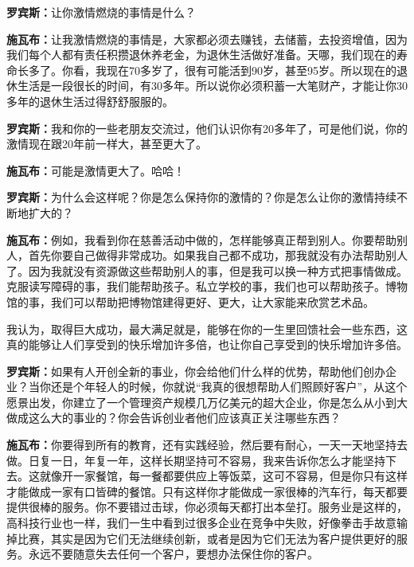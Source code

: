\begin{BookQuote}
\textbf{罗宾斯：}让你激情燃烧的事情是什么？
\end{BookQuote}

\begin{BookQuote}
\textbf{施瓦布：}让我激情燃烧的事情是，大家都必须去赚钱，去储蓄，去投资增值，因为我们每个人都有责任积攒退休养老金，为退休生活做好准备。天哪，我们现在的寿命长多了。你看，我现在70多岁了，很有可能活到90岁，甚至95岁。所以现在的退休生活是一段很长的时间，有30多年。所以说你必须积蓄一大笔财产，才能让你30多年的退休生活过得舒舒服服的。
\end{BookQuote}

\begin{BookQuote}
\textbf{罗宾斯：}我和你的一些老朋友交流过，他们认识你有20多年了，可是他们说，你的激情现在跟20年前一样大，甚至更大了。
\end{BookQuote}

\begin{BookQuote}
\textbf{施瓦布：}可能是激情更大了。哈哈！
\end{BookQuote}

\begin{BookQuote}
\textbf{罗宾斯：}为什么会这样呢？你是怎么保持你的激情的？你是怎么让你的激情持续不断地扩大的？
\end{BookQuote}

\begin{BookQuote}
\textbf{施瓦布：}例如，我看到你在慈善活动中做的，怎样能够真正帮到别人。你要帮助别人，首先你要自己做得非常成功。如果我自己都不成功，那我就没有办法帮助别人了。因为我就没有资源做这些帮助别人的事，但是我可以换一种方式把事情做成。克服读写障碍的事，我们能帮助孩子。私立学校的事，我们也可以帮助孩子。博物馆的事，我们可以帮助把博物馆建得更好、更大，让大家能来欣赏艺术品。
\end{BookQuote}

我认为，取得巨大成功，最大满足就是，能够在你的一生里回馈社会一些东西，这真的能够让人们享受到的快乐增加许多倍，也让你自己享受到的快乐增加许多倍。

\begin{BookQuote}
\textbf{罗宾斯：}如果有人开创全新的事业，你会给他们什么样的优势，帮助他们创办企业？当你还是个年轻人的时候，你就说“我真的很想帮助人们照顾好客户”，从这个愿景出发，你建立了一个管理资产规模几万亿美元的超大企业，你是怎么从小到大做成这么大的事业的？你会告诉创业者他们应该真正关注哪些东西？
\end{BookQuote}

\begin{BookQuote}
\textbf{施瓦布：}你要得到所有的教育，还有实践经验，然后要有耐心，一天一天地坚持去做。日复一日，年复一年，这样长期坚持可不容易，我来告诉你怎么才能坚持下去。这就像开一家餐馆，每一餐都要供应上等饭菜，这可不容易，但是你只有这样才能做成一家有口皆碑的餐馆。只有这样你才能做成一家很棒的汽车行，每天都要提供很棒的服务。你不要错过击球，你必须每天都打出本垒打。服务业是这样的，高科技行业也一样，我们一生中看到过很多企业在竞争中失败，好像拳击手故意输掉比赛，其实是因为它们无法继续创新，或者是因为它们无法为客户提供更好的服务。永远不要随意失去任何一个客户，要想办法保住你的客户。
\end{BookQuote}


